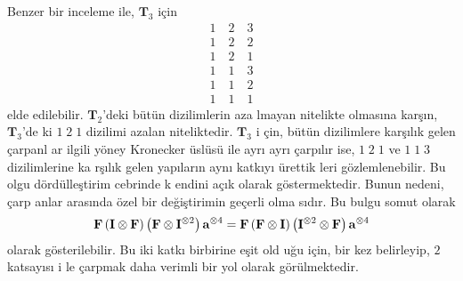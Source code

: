 \documentclass[a4paper,10pt]{article}
\begin{document}
Benzer bir inceleme ile, $\mathbf{T}_{3}$ i\c{c}in %
\begin{eqnarray}
 1\quad 2 \quad 3 \nonumber\\
 1\quad 2 \quad 2 \nonumber\\
 1\quad 2 \quad 1 \nonumber\label{eq:121}\\
 1\quad 1 \quad 3 \nonumber\label{eq:113}\\
 1\quad 1 \quad 2 \nonumber\\
 1\quad 1 \quad 1
\end{eqnarray}
elde edilebilir. $\mathbf{T}_{2}$'deki b\"ut\"un dizilimlerin aza%
lmayan nitelikte ol\-ma\-s\i na kar\c{s}\i n, $\mathbf{T}_{3}$'de%
ki $1\; 2\; 1$ dizilimi azalan nitelik\-tedir. $\mathbf{T}_{3}$ i%
\c{c}in, b\"ut\"un dizilimlere kar\c{s}\i l\i k gelen \c{c}arpanl%
ar ilgili y\"oney Kronecker \"usl\"us\"u i\-le ay\-r{\i} ayr{\i} %
\c{c}arp\i l\i r ise, $1\; 2\; 1$ ve $1\; 1\; 3$ dizilimlerine ka%
r\c{s}\i l\i k gelen yap\i lar\i n ayn{\i} katk\i y{\i} \"urettik%
leri g\"ozlemlenebilir. Bu olgu d\"ord\"ulle\c{s}tirim cebrinde k%
endini a\c{c}\i k olarak g\"ostermektedir. Bunun nedeni, \c{c}arp%
anlar aras\i nda \"ozel bir de\u{g}i\c{s}tirimin ge\c{c}erli olma%
s\i d\i r. Bu bulgu somut olarak %
\begin{equation}
 {\bf F}\left({\bf I}\otimes{\bf F}\right)%
 \left({\bf F}\otimes{\bf I}^{\otimes 2}\right)
 {\bf a}^{\otimes 4} = {\bf F}\left({\bf F}\otimes{\bf I}\right)
 \left({\bf I}^{\otimes 2}\otimes{\bf F}\right){\bf a}%
^{\otimes 4}
\end{equation}
olarak g\"osterilebilir. Bu iki katk{\i} birbirine e\-\c{s}it old%
u\u{g}u i\c{c}in, bir kez belirleyip, $2$ kat\-sa\-y{\i}\-s{\i} i%
\-le \c{c}arpmak daha verimli bir yol olarak g\"or\"ulmektedir. %
\end{document}
